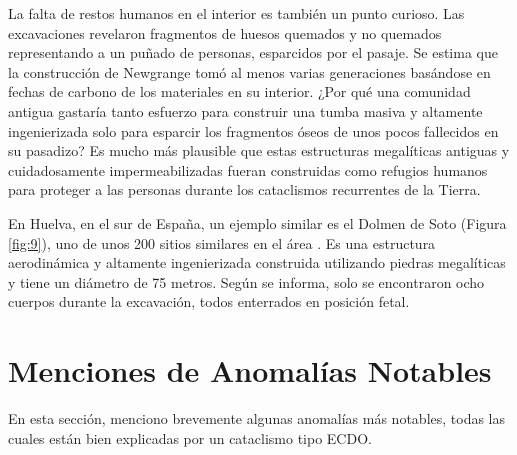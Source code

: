 \documentclass[10pt,twocolumn,letterpaper]{article}
\begin{document}
La falta de restos humanos en el interior es también un punto curioso. Las excavaciones revelaron fragmentos de huesos quemados y no quemados representando a un puñado de personas, esparcidos por el pasaje. Se estima que la construcción de Newgrange tomó al menos varias generaciones basándose en fechas de carbono de los materiales en su interior. ¿Por qué una comunidad antigua gastaría tanto esfuerzo para construir una tumba masiva y altamente ingenierizada solo para esparcir los fragmentos óseos de unos pocos fallecidos en su pasadizo? Es mucho más plausible que estas estructuras megalíticas antiguas y cuidadosamente impermeabilizadas fueran construidas como refugios humanos para proteger a las personas durante los cataclismos recurrentes de la Tierra.

En Huelva, en el sur de España, un ejemplo similar es el Dolmen de Soto (Figura \ref{fig:9}), uno de unos 200 sitios similares en el área \cite{72,32}. Es una estructura aerodinámica y altamente ingenierizada construida utilizando piedras megalíticas y tiene un diámetro de 75 metros. Según se informa, solo se encontraron ocho cuerpos durante la excavación, todos enterrados en posición fetal.

\section{Menciones de Anomalías Notables}

En esta sección, menciono brevemente algunas anomalías más notables, todas las cuales están bien explicadas por un cataclismo tipo ECDO.
\end{document}
